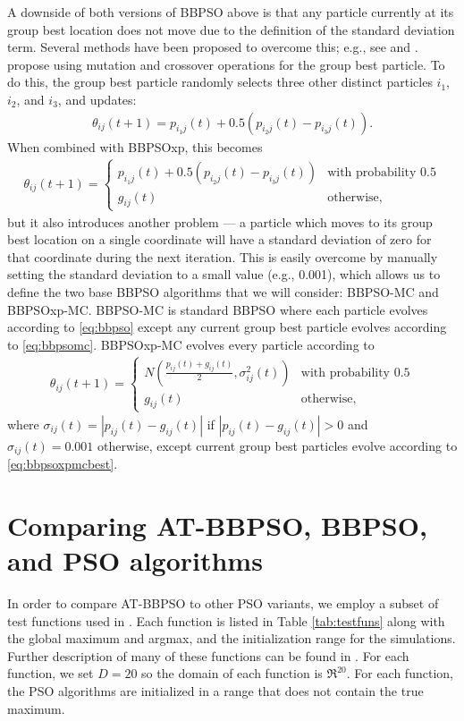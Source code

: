 \documentclass[12pt]{article}
\begin{document}
A downside of both versions of BBPSO above is that any particle currently at its group best location does not move due to the definition of the standard deviation term. Several methods have been proposed to overcome this; e.g., see \citet{hsieh2010modified} and \citet{zhang2011novel}. \citet{zhang2011novel} propose using mutation and crossover operations for the group best particle. To do this, the group best particle randomly selects three other distinct particles $i_1$, $i_2$, and $i_3$, and updates:
\begin{align}\label{eq:bbpsomc}
\theta_{ij}(t+1) = p_{i_1j}(t) + 0.5(p_{i_2j}(t) - p_{i_3j}(t)).
\end{align}
When combined with BBPSOxp, this becomes
\begin{align}\label{eq:bbpsoxpmcbest}
\theta_{ij}(t+1) = \begin{cases} p_{i_1j}(t) + 0.5(p_{i_2j}(t) - p_{i_3j}(t)) & \mbox{with probability }0.5\\
g_{ij}(t) &\mbox{otherwise,}\end{cases}
\end{align}
but it also introduces another problem --- a particle which moves to its group best location on a single coordinate will have a standard deviation of zero for that coordinate during the next iteration. This is easily overcome by manually setting the standard deviation to a small value (e.g., 0.001), which allows us to define the two base BBPSO algorithms that we will consider: BBPSO-MC and BBPSOxp-MC. BBPSO-MC is standard BBPSO where each particle evolves according to \eqref{eq:bbpso} except any current group best particle evolves according to \eqref{eq:bbpsomc}. BBPSOxp-MC evolves every particle according to 
\begin{align}\label{eq:bbpsoxpmcall}
\theta_{ij}(t+1) = \begin{cases} N\left(\frac{p_{ij}(t) + g_{ij}(t)}{2}, \sigma^2_{ij}(t)\right) & \mbox{with probability }0.5\\
g_{ij}(t) &\mbox{otherwise,}\end{cases}
\end{align}
where $\sigma_{ij}(t) = |p_{ij}(t) - g_{ij}(t)|$ if $|p_{ij}(t) - g_{ij}(t)|>0$ and $\sigma_{ij}(t) = 0.001$ otherwise, except current group best particles evolve according to \eqref{eq:bbpsoxpmcbest}. 


\section{Comparing AT-BBPSO, BBPSO, and PSO algorithms}\label{app:psocompare}
In order to compare AT-BBPSO to other PSO variants, we employ a subset of test functions used in \citet{hsieh2010modified}. Each function is listed in Table \ref{tab:testfuns} along with the global maximum and argmax, and the initialization range for the simulations. Further description of many of these functions can be found in \citet{clerc2010particle}. For each function, we set $D=20$ so the domain of each function is $\Re^{20}$. For each function, the PSO algorithms are initialized in a range that does not contain the true maximum.
\end{document}
